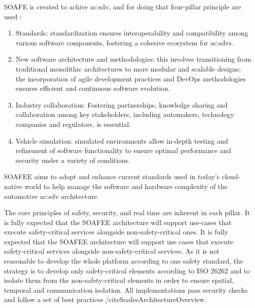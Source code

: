 SOAFE is created to achive \gls{ac:sdv}, and for doing that four-pillar principle are used \cite{SoafeeProject}:
\begin{enumerate}
    \item Standards: standardization ensures interoperability and compatibility among various software components, fostering a cohesive ecosystem for \gls{ac:sdv}s.
    \item New software architecture and methodologies: this involves transitioning from traditional monolithic architectures to more modular and scalable designs; the incorporation of agile development practices and DevOps methodologies ensures efficient and continuous software evolution.
    \item Industry collaboration: Fostering partnerships, knowledge sharing and collaboration among key stakeholders, including automakers, technology companies and regulators, is essential.
    \item Vehicle simulation: simulated environments allow in-depth testing and refinement of software functionality to ensure optimal performance and security under a variety of conditions.
\end{enumerate}
SOAFEE aims to adopt and enhance current standards used in today's cloud-native world to help manage the software and hardware complexity of the automotive \gls{ac:sdv} architecture.

The core principles of safety, security, and real time are inherent in each pillar. It is fully expected that the SOAFEE architecture will support use-cases that execute safety-critical services alongside non-safety-critical ones. It is fully expected that the SOAFEE architecture will support use cases that execute safety-critical services alongside non-safety-critical services. As it is not reasonable to develop the whole platform according to one safety standard, the strategy is to develop only safety-critical elements according to ISO 26262 and to isolate them from the non-safety-critical elements in order to ensure spatial, temporal and communication isolation. All implementations pass security checks and follow a set of best practices /cite{SoafeeArchitectureOverview}.

